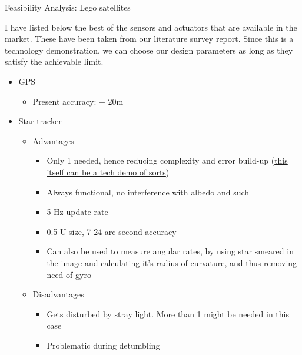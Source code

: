 \documentclass[11pt,a4paper]{article}
\begin{document}
\begin{center}
{\Huge Feasibility Analysis: Lego satellites}
\end{center}

I have listed below the best of the sensors and actuators that are available in the market. These have been taken from our literature survey report. Since this is a technology demonstration, we can choose our design parameters as long as they satisfy the achievable limit.   

\begin{itemize}
\item GPS
\begin{itemize}
\item Present accuracy: $\pm$ 20m 
\end{itemize}

\item Star tracker
\begin{itemize}
\item Advantages
\begin{itemize}
\item Only 1 needed, hence reducing complexity and error build-up (\href{http://digitalcommons.usu.edu/cgi/viewcontent.cgi?article=1238&context=smallsat}{this itself can be a tech demo of sorts})
\item Always functional, no interference with albedo and such
\item 5 Hz update rate
\item 0.5 U size, 7-24 arc-second accuracy
\item Can also be used to measure angular rates, by using star smeared in the image and calculating it's radius of curvature, and thus removing need of gyro
\end{itemize}
\item Disadvantages
\begin{itemize}
\item Gets disturbed by stray light. More than 1 might be needed in this case
\item Problematic during detumbling 
\end{itemize}
\end{itemize}



\end{itemize}
\end{document}
